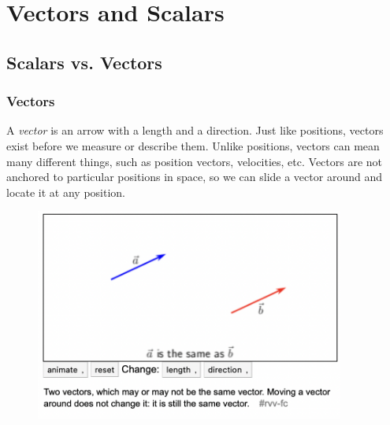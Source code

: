 \section{Vectors and Scalars}



\subsection{Scalars vs. Vectors}

\subsubsection{Vectors}


A \textit{vector} is an arrow with a length and a direction. Just like positions, vectors exist before we measure or describe them. Unlike positions, vectors can mean many different things, such as position vectors, velocities, etc. Vectors are not anchored to particular positions in space, so we can slide a vector around and locate it at any position.

\begin{figure}[!h]
\centering
\includegraphics[angle=0, width=4in]{VectorsScalarsFigures/VectorDef.png}
\vspace{-2mm}
\caption{\small {}}
\vspace{-3mm}
\label{Fig:NewtonsLaws}
\end{figure}

